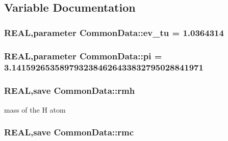 \subsection{Variable Documentation}
\hypertarget{namespace_common_data_a425e3890d3344a540420425e443dc800}{
\subsubsection[{ev\_\-tu}]{\setlength{\rightskip}{0pt plus 5cm}REAL,parameter {\bf CommonData::ev\_\-tu} = 1.0364314}}
\label{namespace_common_data_a425e3890d3344a540420425e443dc800}
\hypertarget{namespace_common_data_a565ffab49e04f2d30ebed2b70485cbb2}{
\subsubsection[{pi}]{\setlength{\rightskip}{0pt plus 5cm}REAL,parameter {\bf CommonData::pi} = 3.1415926535897932384626433832795028841971}}
\label{namespace_common_data_a565ffab49e04f2d30ebed2b70485cbb2}
\hypertarget{namespace_common_data_ab83fa563208d5b60c511fb8561b4cf02}{
\subsubsection[{rmh}]{\setlength{\rightskip}{0pt plus 5cm}REAL,save {\bf CommonData::rmh}}}
\label{namespace_common_data_ab83fa563208d5b60c511fb8561b4cf02}


mass of the H atom \hypertarget{namespace_common_data_a5d2cb89262577c7e0271959b185d97f8}{
\subsubsection[{rmc}]{\setlength{\rightskip}{0pt plus 5cm}REAL,save {\bf CommonData::rmc}}}
\label{namespace_common_data_a5d2cb89262577c7e0271959b185d97f8}


